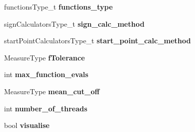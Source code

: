 \begin{DoxyCompactItemize}
\item 
\hypertarget{struct_ox_1_1_ox_shmolli2_options_ae321bfe9403fbcde62737d558cdf227c}{functions\-Type\-\_\-t {\bfseries functions\-\_\-type}}\label{struct_ox_1_1_ox_shmolli2_options_ae321bfe9403fbcde62737d558cdf227c}

\item 
\hypertarget{struct_ox_1_1_ox_shmolli2_options_a677f4fa89f71099635b8bb147b129914}{sign\-Calculators\-Type\-\_\-t {\bfseries sign\-\_\-calc\-\_\-method}}\label{struct_ox_1_1_ox_shmolli2_options_a677f4fa89f71099635b8bb147b129914}

\item 
\hypertarget{struct_ox_1_1_ox_shmolli2_options_a8fe270afa66a8e74b2037ab4f3352c41}{start\-Point\-Calculators\-Type\-\_\-t {\bfseries start\-\_\-point\-\_\-calc\-\_\-method}}\label{struct_ox_1_1_ox_shmolli2_options_a8fe270afa66a8e74b2037ab4f3352c41}

\item 
\hypertarget{struct_ox_1_1_ox_shmolli2_options_abcda28f7c6adfb4bba11c09976d2e039}{Measure\-Type {\bfseries f\-Tolerance}}\label{struct_ox_1_1_ox_shmolli2_options_abcda28f7c6adfb4bba11c09976d2e039}

\item 
\hypertarget{struct_ox_1_1_ox_shmolli2_options_a22acb422cb0d81d8312a39f52751fb3e}{int {\bfseries max\-\_\-function\-\_\-evals}}\label{struct_ox_1_1_ox_shmolli2_options_a22acb422cb0d81d8312a39f52751fb3e}

\item 
\hypertarget{struct_ox_1_1_ox_shmolli2_options_a7b572f1af3eacc663269126d736df8cd}{Measure\-Type {\bfseries mean\-\_\-cut\-\_\-off}}\label{struct_ox_1_1_ox_shmolli2_options_a7b572f1af3eacc663269126d736df8cd}

\item 
\hypertarget{struct_ox_1_1_ox_shmolli2_options_ad1985f4cf4c53a45e979859defded330}{int {\bfseries number\-\_\-of\-\_\-threads}}\label{struct_ox_1_1_ox_shmolli2_options_ad1985f4cf4c53a45e979859defded330}

\item 
\hypertarget{struct_ox_1_1_ox_shmolli2_options_a1698fc161a8670ade81cfde65e337707}{bool {\bfseries visualise}}\label{struct_ox_1_1_ox_shmolli2_options_a1698fc161a8670ade81cfde65e337707}

\end{DoxyCompactItemize}


